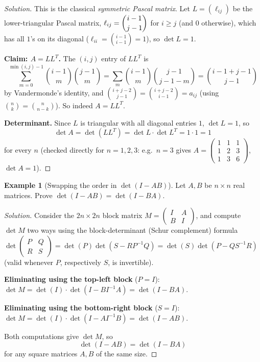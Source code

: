 \documentclass[11pt]{article}
\theoremstyle{definition}
\newtheorem{example}{Example}[section]
\newcommand{\R}{\mathbb{R}}
\begin{document}
\begin{proof}[Solution]
This is the classical \emph{symmetric Pascal matrix}. Let $L=(\ell_{ij})$ be the lower-triangular Pascal matrix, $\ell_{ij}=\dbinom{i-1}{j-1}$ for $i\ge j$ (and $0$ otherwise), which has all $1$'s on its diagonal ($\ell_{ii}=\binom{i-1}{i-1}=1$), so $\det L=1$.

\textbf{Claim: $A=LL^T$.} The $(i,j)$ entry of $LL^T$ is
\[
\sum_{m=0}^{\min(i,j)-1}\binom{i-1}{m}\binom{j-1}{m}=\sum_{m}\binom{i-1}{m}\binom{j-1}{j-1-m}=\binom{i-1+j-1}{j-1}
\]
by Vandermonde's identity, and $\binom{i+j-2}{j-1}=\binom{i+j-2}{i-1}=a_{ij}$ (using $\binom nk=\binom n{n-k}$). So indeed $A=LL^T$.

\textbf{Determinant.} Since $L$ is triangular with all diagonal entries $1$, $\det L=1$, so
\[
\det A=\det(LL^T)=\det L\cdot\det L^T=1\cdot1=\boxed{1}
\]
for every $n$ (checked directly for $n=1,2,3$: e.g.\ $n=3$ gives $A=\begin{pmatrix}1&1&1\\1&2&3\\1&3&6\end{pmatrix}$, $\det A=1$).
\end{proof}

\begin{example}[Swapping the order in $\det(I-AB)$]
Let $A,B$ be $n\times n$ real matrices. Prove $\det(I-AB)=\det(I-BA)$.
\end{example}

\begin{proof}[Solution]
Consider the $2n\times2n$ block matrix $M=\begin{pmatrix}I&A\\B&I\end{pmatrix}$, and compute $\det M$ two ways using the block-determinant (Schur complement) formula $\det\begin{pmatrix}P&Q\\R&S\end{pmatrix}=\det(P)\det(S-RP^{-1}Q)=\det(S)\det(P-QS^{-1}R)$ (valid whenever $P$, respectively $S$, is invertible).

\textbf{Eliminating using the top-left block} ($P=I$): $\det M=\det(I)\cdot\det(I-BI^{-1}A)=\det(I-BA)$.

\textbf{Eliminating using the bottom-right block} ($S=I$): $\det M=\det(I)\cdot\det(I-AI^{-1}B)=\det(I-AB)$.

Both computations give $\det M$, so
\[
\boxed{\det(I-AB)=\det(I-BA)}
\]
for any square matrices $A,B$ of the same size.
\end{proof}
\end{document}
